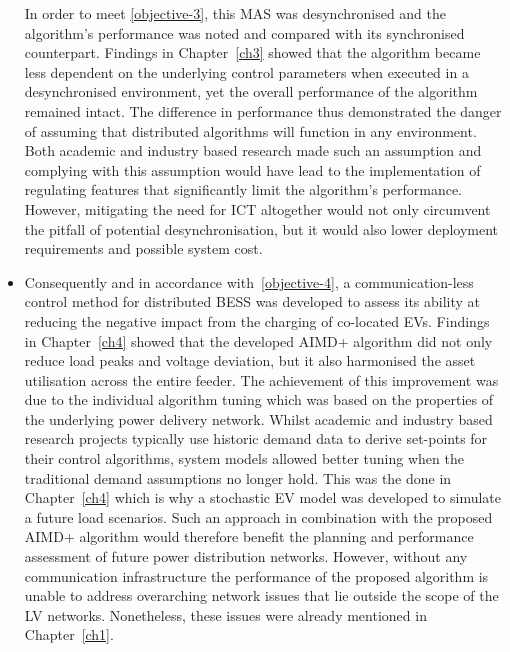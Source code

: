 \begin{itemize}
	In order to meet \ref{objective-3}, this MAS was desynchronised and the algorithm's performance was noted and compared with its synchronised counterpart.
	Findings in Chapter~\ref{ch3} showed that the algorithm became less dependent on the underlying control parameters when executed in a desynchronised environment, yet the overall performance of the algorithm remained intact.
	The difference in performance thus demonstrated the danger of assuming that distributed algorithms will function in any environment.
	Both academic and industry based research made such an assumption and complying with this assumption would have lead to the implementation of regulating features that significantly limit the algorithm's performance.
	However, mitigating the need for ICT altogether would not only circumvent the pitfall of potential desynchronisation, but it would also lower deployment requirements and possible system cost.
	\item
	Consequently and in accordance with \ref{objective-4}, a communication-less control method for distributed BESS was developed to assess its ability at reducing the negative impact from the charging of co-located EVs.
	Findings in Chapter~\ref{ch4} showed that the developed AIMD+ algorithm did not only reduce load peaks and voltage deviation, but it also harmonised the asset utilisation across the entire feeder.
	The achievement of this improvement was due to the individual algorithm tuning which was based on the properties of the underlying power delivery network.
	Whilst academic and industry based research projects typically use historic demand data to derive set-points for their control algorithms, system models allowed better tuning when the traditional demand assumptions no longer hold.
	This was the done in Chapter~\ref{ch4} which is why a stochastic EV model was developed to simulate a future load scenarios.
	Such an approach in combination with the proposed AIMD+ algorithm would therefore benefit the planning and performance assessment of future power distribution networks.
	However, without any communication infrastructure the performance of the proposed algorithm is unable to address overarching network issues that lie outside the scope of the LV networks.
	Nonetheless, these issues were already mentioned in Chapter~\ref{ch1}.
\end{itemize}







